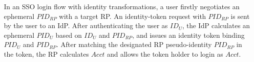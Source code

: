 In an SSO login flow with identity transformations,
    a user firstly negotiates an ephemeral $PID_{RP}$ with a target RP.
An identity-token request with $PID_{RP}$ is sent by the user to an IdP.
After authenticating the user as $ID_U$, the IdP calculates an ephemeral $PID_U$ based on $ID_U$ and $PID_{RP}$,
    and issues an identity token binding $PID_U$ and $PID_{RP}$.
After matching the designated RP pseudo-identity $PID_{RP}$ in the token,
    the RP calculates $Acct$ and allows the token holder to login as $Acct$.



